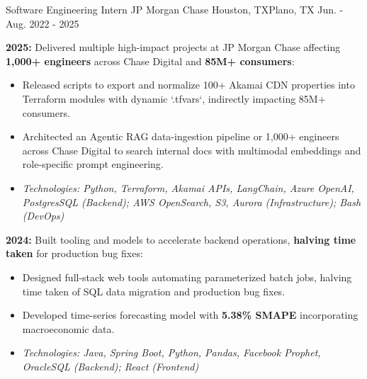 

\begin{cventries}


    \cventry
    {Software Engineering Intern} %
    {JP Morgan Chase} %
    {Houston, TX\newline Plano, TX} %
    {Jun. - Aug. 2022 - 2025} %
    {
     \begin{cvitems} %
      \item {\textbf{2025:} Delivered multiple high-impact projects at JP Morgan Chase affecting \textbf{1,000+ engineers} across Chase Digital and \textbf{85M+ consumers}:
      \begin{itemize}
        \item Released scripts to export and normalize 100+ Akamai CDN properties into Terraform modules with dynamic `.tfvars`, indirectly impacting 85M+ consumers.
        \item Architected an Agentic RAG data-ingestion pipeline or 1,000+ engineers across Chase Digital to search internal docs with multimodal embeddings and role-specific prompt engineering.
        \item \textit{Technologies: Python, Terraform, Akamai APIs, LangChain, Azure OpenAI, PostgresSQL (Backend); AWS OpenSearch, S3, Aurora (Infrastructure); Bash (DevOps)}
      \end{itemize}
      }
      \item { \textbf{2024:} Built tooling and models to accelerate backend operations, \textbf{halving time taken} for production bug fixes:
      \begin{itemize}
        \item Designed full-stack web tools automating parameterized batch jobs, halving time taken of SQL data migration and production bug fixes.
        \item Developed time-series forecasting model with \textbf{5.38\% SMAPE} incorporating macroeconomic data.
        \item \textit{Technologies: Java, Spring Boot, Python, Pandas, Facebook Prophet, OracleSQL (Backend); React (Frontend)}

\end{itemize}}
\end{cvitems}}
\end{cventries}
